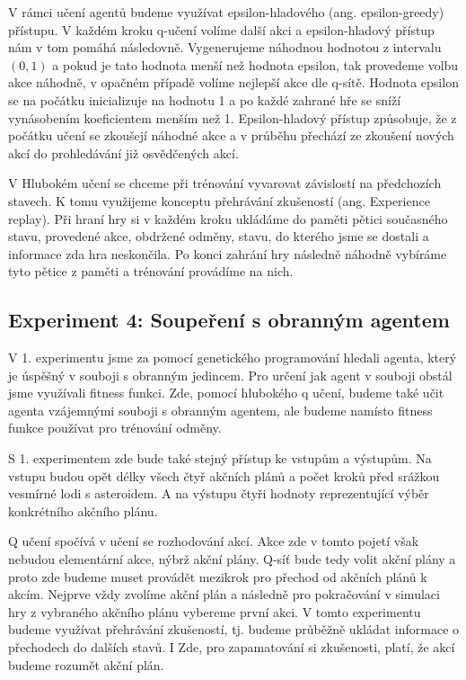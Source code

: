 V rámci učení agentů budeme využívat epsilon-hladového (ang. epsilon-greedy) přístupu. V každém kroku q-učení volíme další akci a epsilon-hladový přístup nám v tom pomáhá následovně.
Vygenerujeme náhodnou hodnotou z intervalu $(0,1)$ a pokud je tato hodnota menší než hodnota epsilon, tak provedeme volbu akce náhodně, v opačném případě volíme nejlepší akce dle q-sítě.
Hodnota epsilon se na počátku inicializuje na hodnotu 1 a po každé zahrané hře se sníží vynásobením koeficientem menším než 1. 
Epsilon-hladový přístup způsobuje, že z počátku učení se zkoušejí náhodné akce a v průběhu přechází ze zkoušení nových akcí do prohledávání již osvědčených akcí.

\par
V Hlubokém učení se chceme při trénování vyvarovat závislostí na předchozích stavech. K tomu využijeme konceptu přehrávání zkušeností (ang. Experience replay).
Při hraní hry si v každém kroku ukládáme do paměti pětici současného stavu, provedené akce, obdržené odměny, stavu, do kterého jsme se dostali a informace zda hra neskončila.
Po konci zahrání hry následně náhodně vybíráme tyto pětice z paměti a trénování provádíme na nich.






\subsection{Experiment 4: Soupeření s obranným agentem}
V 1. experimentu jsme za pomocí genetického programování hledali agenta, který je úspěšný v souboji s obranným jedincem. Pro určení jak agent v souboji obstál jsme využívali fitness funkci.
Zde, pomocí hlubokého q učení, budeme také učit agenta vzájemnými souboji s obranným agentem, ale budeme namísto fitness funkce používat pro trénování odměny.

S 1. experimentem zde bude také stejný přístup ke vstupům a výstupům. 
Na vstupu budou opět délky všech čtyř akčních plánů a počet kroků před srážkou vesmírné lodi s asteroidem.
A na výstupu čtyři hodnoty reprezentující výběr konkrétního akčního plánu.

Q učení spočívá v učení se rozhodování akcí. Akce zde v tomto pojetí však nebudou elementární akce, nýbrž akční plány. 
Q-síť bude tedy volit akční plány a proto zde budeme muset provádět mezikrok pro přechod od akčních plánů k akcím.
Nejprve vždy zvolíme akční plán a následně pro pokračování v simulaci hry z vybraného akčního plánu vybereme první akci.
V tomto experimentu budeme využívat přehrávání zkušeností, tj. budeme průběžně ukládat informace o přechodech do dalších stavů. 
I Zde, pro zapamatování si zkušenosti, platí, že akcí budeme rozumět akční plán.



